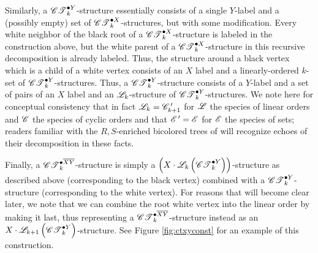 \documentclass[sectionflow,singlespace,twoside,boldmathhdr,draft]{brandiss} %
\numberwithin{section}{chapter}
\numberwithin{figure}{chapter}
\begin{document}
Similarly, a $\pointed[Y]{\specname{CT}}_{k}$-structure essentially consists of a single $Y$-label and a (possibly empty) set of $\pointed[X]{\specname{CT}}_{k}$-structures, but with some modification.
Every white neighbor of the black root of a $\pointed[X]{\specname{CT}}_{k}$-structure is labeled in the construction above, but the white parent of a $\pointed[X]{\specname{CT}}_{k}$-structure in this recursive decomposition is already labeled.
Thus, the structure around a black vertex which is a child of a white vertex consists of an $X$ label and a linearly-ordered $k$-set of $\pointed[Y]{\specname{CT}}_{k}$-structures.
Thus, a $\pointed[Y]{\specname{CT}}_{k}$-structure consists of a $Y$-label and a set of pairs of an $X$ label and an $\specname{L}_{k}$-structure of $\pointed[Y]{\specname{CT}}_{k}$-structures.
We note here for conceptual consistency that in fact $\specname{L}_{k} = \deriv{\specname{C}}_{k+1}$ for $\specname{L}$ the species of linear orders and $\specname{C}$ the species of cyclic orders and that $\deriv{\specname{E}} = \specname{E}$ for $\specname{E}$ the species of sets; readers familiar with the $R, S$-enriched bicolored trees of \cite[\S 3.2]{bll:species} will recognize echoes of their decomposition in these facts.

Finally, a $\pointed[\overline{XY}]{\specname{CT}}_{k}$-structure is simply a $\pbrac{X \cdot \specname{L}_{k} \pbrac{\pointed[Y]{\specname{CT}}_{k}}}$-structure as described above (corresponding to the black vertex) combined with a $\pointed[Y]{\specname{CT}}_{k}$-structure (corresponding to the white vertex).
For reasons that will become clear later, we note that we can combine the root white vertex into the linear order by making it last, thus representing a $\pointed[\overline{XY}]{\specname{CT}}_{k}$-structure instead as an $X \cdot \specname{L}_{k+1} \pbrac{\pointed[Y]{\specname{CT}}_{k}}$-structure.
See Figure \ref{fig:ctxyconst} for an example of this construction.
\end{document}
